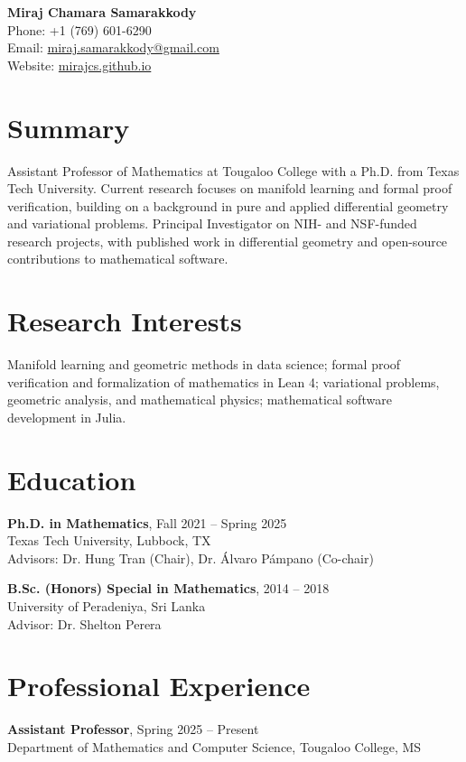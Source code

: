 \documentclass[11pt]{article}
\begin{document}
\begin{center}
	{\LARGE \textbf{Miraj Chamara Samarakkody}}\\[6pt]
	Phone: +1 (769) 601-6290\\
	Email: \href{mailto:miraj.samarakkody@gmail.com}{miraj.samarakkody@gmail.com}\\
	Website: \href{https://mirajcs.github.io/}{mirajcs.github.io}
\end{center}

\section*{Summary}

Assistant Professor of Mathematics at Tougaloo College with a Ph.D. from Texas Tech University. Current research focuses on manifold learning and formal proof verification, building on a background in pure and applied differential geometry and variational problems. Principal Investigator on NIH- and NSF-funded research projects, with published work in differential geometry and open-source contributions to mathematical software.

\section*{Research Interests}

Manifold learning and geometric methods in data science; formal proof verification and formalization of mathematics in Lean 4; variational problems, geometric analysis, and mathematical physics; mathematical software development in Julia.

\section*{Education}

\textbf{Ph.D. in Mathematics}, Fall 2021 -- Spring 2025\\
Texas Tech University, Lubbock, TX\\
Advisors: Dr. Hung Tran (Chair), Dr. \'Alvaro P\'ampano (Co-chair)

\vspace{6pt}
\textbf{B.Sc. (Honors) Special in Mathematics}, 2014 -- 2018\\
University of Peradeniya, Sri Lanka\\
Advisor: Dr. Shelton Perera

\section*{Professional Experience}
\textbf{Assistant Professor}, Spring 2025 -- Present\\
Department of Mathematics and Computer Science, Tougaloo College, MS
\end{document}
